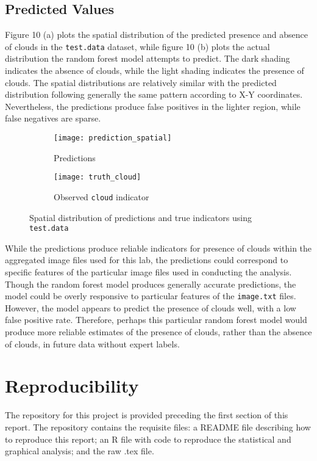 \documentclass[11pt]{article}
\begin{document}
\subsection{Predicted Values}
\indent Figure 10 (a) plots the spatial distribution of the predicted presence and absence of clouds in the \texttt{test.data} dataset, while figure 10 (b) plots the actual distribution the random forest model attempts to predict.  The dark shading indicates the absence of clouds, while the light shading indicates the presence of clouds. The spatial distributions are relatively similar with the predicted distribution following generally the same pattern according to X-Y coordinates. Nevertheless, the predictions produce false positives in the lighter region, while false negatives are sparse. \\
\begin{figure}[!h]
\begin{subfigure}{.5\linewidth}
  \centering
  \texttt{[image: prediction\_spatial]}
  \caption{Predictions}
  \label{fig:sfig1}
\end{subfigure}%
\begin{subfigure}{.5\linewidth}
  \centering
  \texttt{[image: truth\_cloud]}
  \caption{Observed \texttt{cloud} indicator}
  \label{fig:sfig2}
\end{subfigure}
\caption{Spatial distribution of predictions and true indicators using \texttt{test.data}}
\label{fig:fig}
\end{figure}

\indent While the predictions produce reliable indicators for presence of clouds within the aggregated image files used for this lab, the predictions could correspond to specific features of the particular image files used in conducting the analysis.  Though the random forest model produces generally accurate predictions, the model could be overly responsive to particular features of the \texttt{image.txt} files. However, the model appears to predict the presence of clouds well, with a low false positive rate. Therefore, perhaps this particular random forest model would produce more reliable estimates of the presence of clouds, rather than the absence of clouds, in future data without expert labels.   
\section{Reproducibility}
The repository for this project is provided preceding the first section of this report.  The repository contains the requisite files: a README file describing how to reproduce this report; an R file with code to reproduce the statistical and graphical analysis; and the raw .tex file.  
\end{document}
